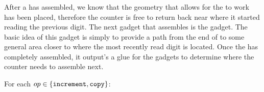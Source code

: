 \subsubsection{\returnpath}
%
After a {\dtop} has assembled, we know that the geometry that allows for the {\warpunit} to work has been placed, therefore the counter is free to return back near where it started reading the previous digit.
%
The next gadget that assembles is the {\returnpath} gadget.
%
The basic idea of this gadget is simply to provide a path from the end of {\dtop} to some general area closer to where the most recently read digit is located.
%
Once the {\returnpath} has completely assembled, it output's a glue for the {\nextread} gadgets to determine where the counter needs to assemble next.
%

For each $op\in \{ {\tt increment}, {\tt copy} \}$:
